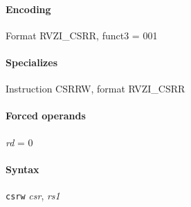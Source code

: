{\paragraph{Encoding} Format \textsf{RVZI\_CSRR, funct3 = 001}\\



\paragraph{Specializes} Instruction CSRRW, format RVZI\_CSRR

\paragraph{Forced operands} \emph{rd} = 0

\paragraph{Syntax} \texttt{csrw} \emph{csr}, \emph{rs1}
\newpage
\subsubsectionfont{}
}
